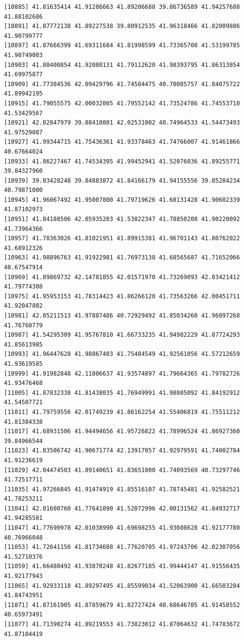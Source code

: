 \documentclass[
  letterpaper,
  DIV=11,
  numbers=noendperiod]{scrartcl}
\begin{document}
\begin{verbatim}
[10885] 41.81635414 41.91286663 41.89206688 39.86736589 41.94257688 41.88102686
[10891] 41.87772138 41.89227538 39.80912535 41.96318466 41.82009886 41.90799777
[10897] 41.87666399 41.69311684 41.81998599 41.73365708 41.53199785 41.90749003
[10903] 41.80400854 41.92080131 41.79112620 41.98393795 41.86313854 41.69975877
[10909] 41.77384536 42.09429796 41.74584475 40.70085757 41.84075722 41.89942195
[10915] 41.79055575 42.00032005 41.79552142 41.73524786 41.74553710 41.53429567
[10921] 42.02847979 39.88410801 42.02531002 40.74964533 41.54473493 41.97529087
[10927] 41.99344715 41.75436361 41.93378463 41.74766007 41.91461866 40.67664024
[10933] 41.86227467 41.74534395 41.99452941 41.52076036 41.89255771 39.84327960
[10939] 39.83428248 39.84883872 41.84166179 41.94155556 39.85284234 40.79871000
[10945] 41.96067492 41.95007800 41.79719626 41.68131428 41.90602339 41.87102973
[10951] 41.84188506 42.05935203 41.53822347 41.78850208 41.90220092 41.73964366
[10957] 41.78363026 41.81021951 41.89915381 41.96701143 41.80762022 41.68912326
[10963] 41.98896763 41.91922981 41.76973138 41.68565687 41.71652066 40.67547914
[10969] 41.89869732 42.14781855 42.01571970 41.73269093 42.03421412 41.79774308
[10975] 41.95953153 41.78314423 41.86266120 41.73563266 42.00451711 41.92047802
[10981] 42.05211513 41.97887486 40.72929492 41.85034260 41.96097268 41.76760779
[10987] 41.54295309 41.95767810 41.66733235 41.94982229 41.87724293 41.85613985
[10993] 41.96447628 41.98867403 41.75484549 41.92561056 41.57212659 41.93619585
[10999] 41.91982848 42.11806637 41.93574897 41.79664365 41.79782726 41.93476468
[11005] 41.87832338 41.81438035 41.76949991 41.98085092 41.84192912 41.54507721
[11011] 41.79759556 42.01749239 41.86162254 41.55406819 41.75511212 41.81384338
[11017] 41.68931506 41.94494656 41.95726822 41.78996524 41.86927360 39.84966544
[11023] 41.83506742 41.90671774 42.13917057 41.92979591 41.74002784 41.91236619
[11029] 42.04474503 41.89140651 41.83651000 41.74093569 40.73297746 41.72517711
[11035] 41.97266845 41.91474919 41.85516107 41.78745481 41.92582521 41.78253211
[11041] 42.01600760 41.77641090 41.52072996 42.00131562 41.84932717 41.94285581
[11047] 41.77690978 42.01038990 41.69698255 41.93608628 41.92177780 40.76966048
[11053] 41.72641156 41.81734688 41.77620705 41.97243706 42.02307056 41.52710376
[11059] 41.66480492 41.93870248 41.82677185 41.99444147 41.91556435 41.92177943
[11065] 41.92933118 41.89297495 41.85599034 41.52063900 41.66503284 41.84743951
[11071] 41.87161905 41.87859679 41.82727424 40.68646705 41.91458552 40.65973491
[11077] 41.71390274 41.89219553 41.73823012 41.87064632 41.74783672 41.87104419

\end{verbatim}
\end{document}
